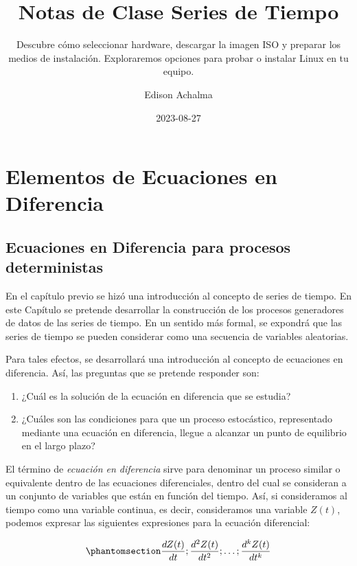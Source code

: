 \documentclass[
  a4paper,
]{article}
\title{Notas de Clase Series de Tiempo}
\subtitle{Descubre cómo seleccionar hardware, descargar la imagen ISO y
preparar los medios de instalación. Exploraremos opciones para probar o
instalar Linux en tu equipo.}
\author{Edison Achalma}
\date{2023-08-27}
\begin{document}
\maketitle

\section{Elementos de Ecuaciones en
Diferencia}\label{elementos-de-ecuaciones-en-diferencia}

\subsection{Ecuaciones en Diferencia para procesos
deterministas}\label{ecuaciones-en-diferencia-para-procesos-deterministas}

En el capítulo previo se hizó una introducción al concepto de series de
tiempo. En este Capítulo se pretende desarrollar la construcción de los
procesos generadores de datos de las series de tiempo. En un sentido más
formal, se expondrá que las series de tiempo se pueden considerar como
una secuencia de variables aleatorias.

Para tales efectos, se desarrollará una introducción al concepto de
ecuaciones en diferencia. Así, las preguntas que se pretende responder
son:

\begin{enumerate}
\def\labelenumi{\arabic{enumi}.}
\item
  ¿Cuál es la solución de la ecuación en diferencia que se estudia?
\item
  ¿Cuáles son las condiciones para que un proceso estocástico,
  representado mediante una ecuación en diferencia, llegue a alcanzar un
  punto de equilibrio en el largo plazo?
\end{enumerate}

El término de \emph{ecuación en diferencia} sirve para denominar un
proceso similar o equivalente dentro de las ecuaciones diferenciales,
dentro del cual se consideran a un conjunto de variables que están en
función del tiempo. Así, si consideramos al tiempo como una variable
continua, es decir, consideramos una variable \(Z(t)\), podemos expresar
las siguientes expresiones para la ecuación diferencial:

\begin{equation}\phantomsection\label{eq-eqDiff}{
    \frac{dZ(t)}{dt}; \frac{d^2Z(t)}{dt^2}; \ldots; \frac{d^kZ(t)}{dt^k}
}\end{equation}
\end{document}
